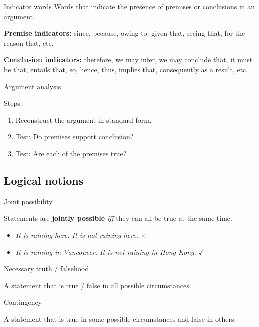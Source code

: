 \documentclass{article}
\begin{document}
\begin{knBox}
    {Indicator words}
    Words that indicate the presence of premises or conclusions in an argument.

    \textbf{Premise indicators:} since, because, owing to, given that, seeing that, for the reason that, etc.

    \textbf{Conclusion indicators:} therefore, we may infer, we may conclude that, it must be that, entails that, so, hence, thus, implies that, consequently as a result, etc.
\end{knBox}

\begin{knBox}
    {Argument analysis}

    Steps:
    \begin{enumerate}
        \item Reconstruct the argument in standard form.
        \item Test: Do premises support conclusion?
        \item Test: Are each of the premises true?
    \end{enumerate}
\end{knBox}

\subsection{Logical notions}


\begin{definition}
    {Joint possibility}

    Statements are \textbf{jointly possible} \textit{iff} they can all be true at the same time.

    \tcblower

    \begin{itemize}
        \item \textit{It is raining here. It is not raining here.} $\times$
        \item \textit{It is raining in Vancouver. It is not raining in Hong Kong.} $\checkmark$
    \end{itemize}

\end{definition}

\begin{definition}
    {Necessary truth / falsehood}

    A statement that is true / false in all possible circumstances.
\end{definition}

\begin{definition}
    {Contingency}

    A statement that is true in some possible circumstances and false in others.
\end{definition}
\end{document}
